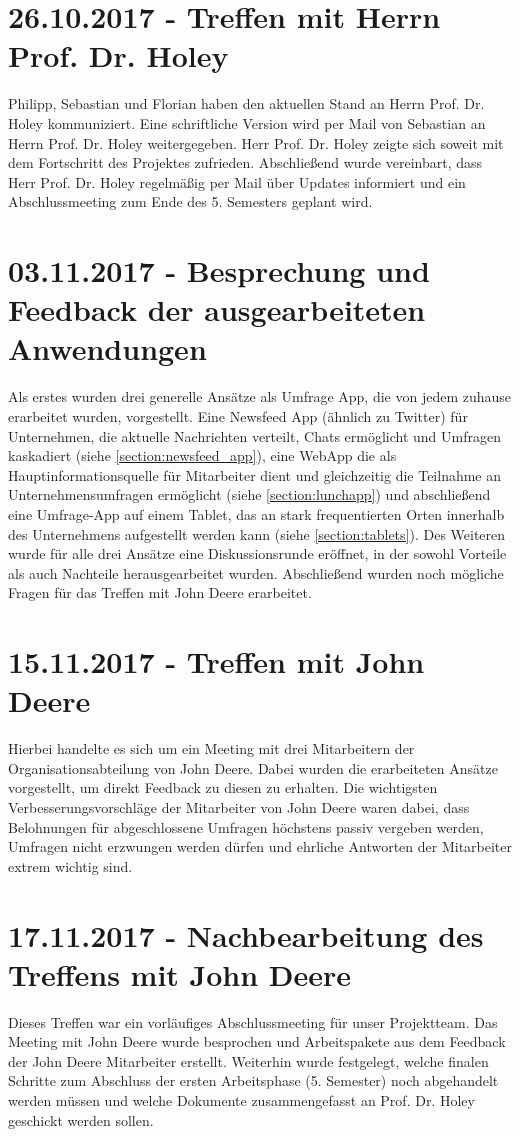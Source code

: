 \section{26.10.2017 - Treffen mit Herrn Prof. Dr. Holey}
Philipp, Sebastian und Florian haben den aktuellen Stand an Herrn Prof. Dr. Holey kommuniziert. Eine schriftliche Version wird per Mail von Sebastian an Herrn Prof. Dr. Holey weitergegeben. Herr Prof. Dr. Holey zeigte sich soweit mit dem Fortschritt des Projektes zufrieden. Abschließend wurde vereinbart, dass Herr Prof. Dr. Holey regelmäßig per Mail über Updates informiert und ein Abschlussmeeting zum Ende des 5. Semesters geplant wird.

\section{03.11.2017 - Besprechung und Feedback der ausgearbeiteten Anwendungen}
Als erstes wurden drei generelle Ansätze als Umfrage App, die von jedem zuhause erarbeitet wurden, vorgestellt. Eine Newsfeed App (ähnlich zu Twitter) für Unternehmen, die aktuelle Nachrichten verteilt, Chats ermöglicht und Umfragen kaskadiert (siehe \vref{section:newsfeed_app}), eine WebApp die als Hauptinformationsquelle für Mitarbeiter dient und gleichzeitig die Teilnahme an Unternehmensumfragen ermöglicht (siehe \vref{section:lunchapp}) und abschließend eine Umfrage-App auf einem Tablet, das an stark frequentierten Orten innerhalb des Unternehmens aufgestellt werden kann (siehe \vref{section:tablets}). Des Weiteren wurde für alle drei Ansätze eine Diskussionsrunde eröffnet, in der sowohl Vorteile als auch Nachteile herausgearbeitet wurden. Abschließend wurden noch mögliche Fragen für das Treffen mit John Deere erarbeitet.

\section{15.11.2017 - Treffen mit John Deere}
Hierbei handelte es sich um ein Meeting mit drei Mitarbeitern der Organisationsabteilung von John Deere. Dabei wurden die erarbeiteten Ansätze vorgestellt, um direkt Feedback zu diesen zu erhalten. Die wichtigsten Verbesserungsvorschläge der Mitarbeiter von John Deere waren dabei, dass Belohnungen für abgeschlossene Umfragen höchstens passiv vergeben werden, Umfragen nicht erzwungen werden dürfen und ehrliche Antworten der Mitarbeiter extrem wichtig sind.

\section{17.11.2017 - Nachbearbeitung des Treffens mit John Deere}
Dieses Treffen war ein vorläufiges Abschlussmeeting für unser Projektteam. Das Meeting mit John Deere wurde besprochen und Arbeitspakete aus dem Feedback der John Deere Mitarbeiter erstellt. Weiterhin wurde festgelegt, welche finalen Schritte zum Abschluss der ersten Arbeitsphase (5. Semester) noch abgehandelt werden müssen und welche Dokumente zusammengefasst an Prof. Dr. Holey geschickt werden sollen.

